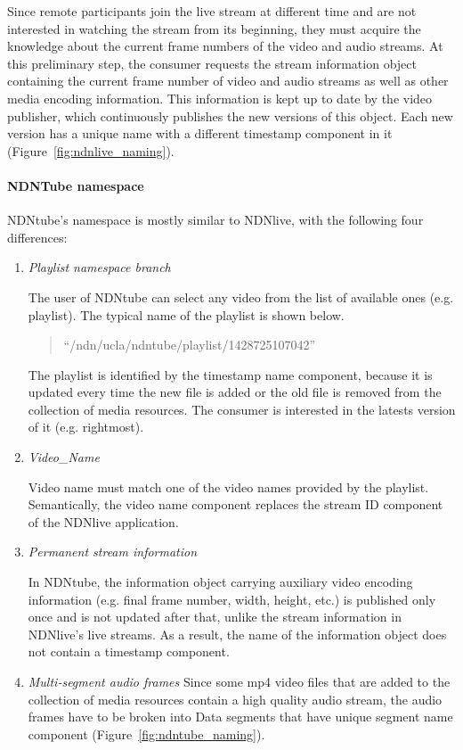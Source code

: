 Since remote participants join the live stream at different time and are not interested in watching the stream from its beginning, they must acquire the knowledge about the current frame numbers of the video and audio streams. At this preliminary step, the consumer requests the stream information object containing the current frame number of video and audio streams as well as other media encoding information. This information is kept up to date by the video publisher, which continuously publishes the new versions of this object. Each new version has a unique name with a different timestamp component in it (Figure~\ref{fig:ndnlive_naming}).


\paragraph{NDNTube namespace} %
\label{par:ndntube_naming}
\vspace{0.3cm}

NDNtube's namespace is mostly similar to NDNlive, with the following four differences:
\begin{enumerate}
	\item{\textit{Playlist namespace branch}} 
		
		The user of NDNtube can select any video from the list of available ones (e.g. playlist). The typical name of the playlist is shown below.
		\begin{quote}
		``/ndn/ucla/ndntube/playlist/1428725107042''
		\end{quote}
    The playlist is identified by the timestamp name component, because it is updated every time the new file is added or the old file is removed from the collection of media resources. The consumer is interested in the latests version of it (e.g. rightmost).
    
	\item{\textit{Video\_Name}} 

		Video name must match one of the video names provided by the playlist. Semantically, the video name component replaces the stream ID component of the NDNlive application.

	\item{\textit{Permanent stream information}} 

    In NDNtube, the information object carrying auxiliary video encoding information (e.g. final frame number, width, height, etc.) is published only once and is not updated after that, unlike the stream information in NDNlive's live streams. As a result, the name of the information object does not contain a timestamp component.

	\item{\textit{Multi-segment audio frames}} 
   Since some mp4 video files that are added to the collection of media resources contain a high quality audio stream, the audio frames have to be broken into Data segments that have unique segment name component (Figure~\ref{fig:ndntube_naming}).
\end{enumerate}

